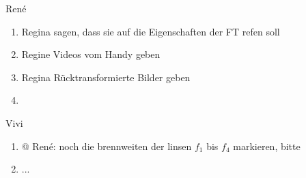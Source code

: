 
René
\begin{enumerate}
	\item Regina sagen, dass sie auf die Eigenschaften der FT refen soll
	\item Regine Videos vom Handy geben
	\item Regina Rücktransformierte Bilder geben
	\item 
\end{enumerate}

Vivi
\begin{enumerate}
	\item @ René: noch die brennweiten der linsen $f_1$ bis $f_4$ markieren, bitte   
	 
	\item ...
\end{enumerate}